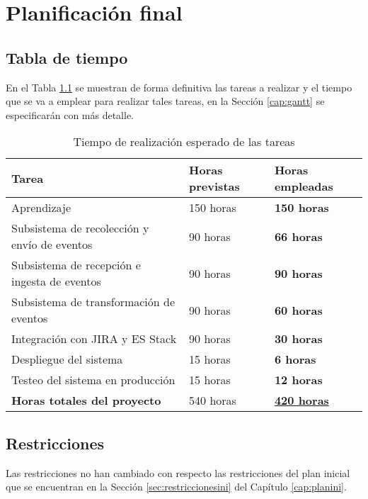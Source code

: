 \chapter{Planificación final}\label{cap:planificacion}


\section{Tabla de tiempo}
En el Tabla \ref{tabla:tiempotareas} se muestran de forma definitiva las tareas a realizar y el tiempo que se va a emplear para realizar tales tareas, en la Sección \ref{cap:gantt} se especificarán con más detalle.

\begin{table}[H]\label{tabla:tiempotareas}
	\centering
	\begin{tabular}{|l|l|l|}
		\hline
		\textbf{Tarea}                               & \textbf{Horas previstas} & \textbf{Horas empleadas}       \\ \hline
		Aprendizaje                                  & 150 horas                & \textbf{150 horas}             \\ \hline
		Subsistema de recolección y envío de eventos & 90 horas                 & \textbf{66 horas}              \\ \hline
		Subsistema de recepción e ingesta de eventos & 90 horas                 & \textbf{90 horas}              \\ \hline
		Subsistema de transformación de eventos      & 90 horas                 & \textbf{60 horas}              \\ \hline
		Integración con JIRA y ES Stack              & 90 horas                 & \textbf{30 horas}              \\ \hline
		Despliegue del sistema                       & 15 horas                 & \textbf{6 horas}               \\ \hline
		Testeo del sistema en producción             & 15 horas                 & \textbf{12 horas}              \\ \hline
		\textbf{Horas totales del proyecto}          & 540 horas                & \underline{\textbf{420 horas}} \\ \hline
	\end{tabular}
	\caption{Tiempo de realización esperado de las tareas}
\end{table}

\section{Restricciones}
Las restricciones no han cambiado con respecto las restricciones del plan inicial que se encuentran en la Sección \ref{sec:restriccionesini} del Capítulo \ref{cap:planini}.

